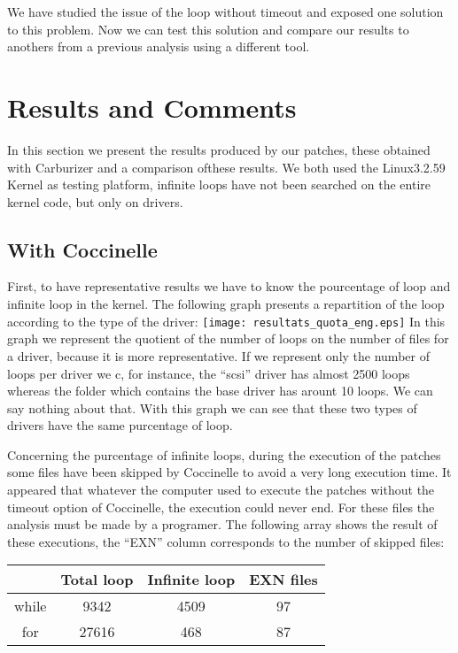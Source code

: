 \documentclass[a4paper,12pt]{article}
\begin{document}
We have studied the issue of the loop without timeout and exposed one solution to this problem. Now we can test this solution and compare our results to anothers from a previous analysis using a different tool.
\newpage

\section{Results and Comments}
 In this section we present the results produced by our patches, these obtained with Carburizer and a comparison ofthese results. We both used the Linux3.2.59 Kernel as testing platform, infinite loops have not been searched on the entire kernel code, but only on drivers.

\subsection{With Coccinelle}
First, to have representative results we have to know the pourcentage of loop and infinite loop in the kernel.
The following graph presents a repartition of the loop according to the type of the driver:
\newline
\texttt{[image: resultats\_quota\_eng.eps]}
In this graph we represent the quotient of the number of loops on the number of files for a driver, because it is more representative. If we represent only the number of loops per driver we c, for instance, the ``scsi'' driver has almost 2500 loops whereas the folder which contains the base driver has arount 10 loops. We can say nothing about that. With this graph we can see that these two types of drivers have the same purcentage of loop.
  
Concerning the purcentage of infinite loops, during the execution of the patches some files have been skipped by Coccinelle to avoid a very long execution time. It appeared that whatever the computer used to execute the patches without the timeout option of Coccinelle, the execution could never end. For these files the analysis must be made by a programer. The following array shows the result of these executions, the ``EXN'' column corresponds to the number of skipped files:

\vspace*{5mm}
\begin{center}
\begin{tabular}{|c|c|c|c|}
  \hline
    & Total loop & Infinite loop & EXN files \\
  \hline
  while & 9342 &  4509  & 97 \\
  \hline
  for   &  27616 & 468 & 87 \\
  \hline
\end{tabular} 
\end{center}
\vspace*{5mm}
\end{document}
